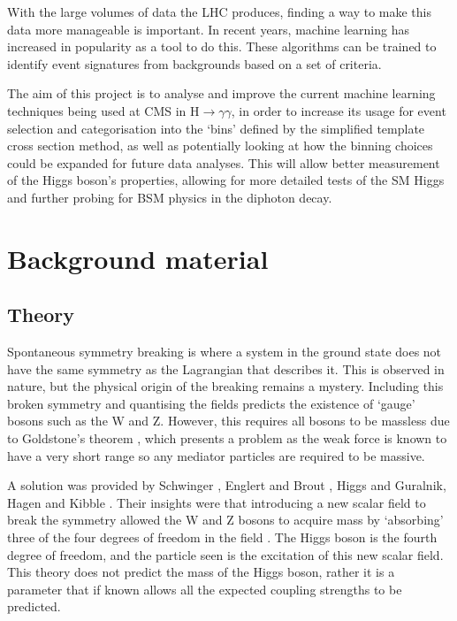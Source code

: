 \documentclass[12pt]{article}
\begin{document}
With the large volumes of data the LHC produces, finding a way to make this data more manageable is important. In recent years, machine learning has increased in popularity as a tool to do this. These algorithms can be trained to identify event signatures from backgrounds based on a set of criteria. 

The aim of this project is to analyse and improve the current machine learning techniques being used at CMS in H$\rightarrow \gamma\gamma$, in order to increase its usage for event selection and categorisation into the `bins' defined by the simplified template cross section method, as well as potentially looking at how the binning choices could be expanded for future data analyses. This will allow better measurement of the Higgs boson's properties, allowing for more detailed tests of the SM Higgs and further probing for BSM physics in the diphoton decay. 

\section*{Background material}

\subsection*{Theory}

Spontaneous symmetry breaking is where a system in the ground state does not have the same symmetry as the Lagrangian that describes it. This is observed in nature, but the physical origin of the breaking remains a mystery. Including this broken symmetry and quantising the fields predicts the existence of `gauge' bosons such as the W and Z. However, this requires all bosons to be massless due to Goldstone's theorem \cite{higgstheory}, which presents a problem as the weak force is known to have a very short range so any mediator particles are required to be massive.

A solution was provided by Schwinger \cite{theory1}, Englert and Brout \cite{theory2}, Higgs \cite{higgstheory} and Guralnik, Hagen and Kibble \cite{theory3}. Their insights were that introducing a new scalar field to break the symmetry allowed the W and Z bosons to acquire mass by `absorbing' three of the four degrees of freedom in the field \cite{theory4}. The Higgs boson is the fourth degree of freedom, and the particle seen is the excitation of this new scalar field. This theory does not predict the mass of the Higgs boson, rather it is a parameter that if known allows all the expected coupling strengths to be predicted. 
\end{document}
